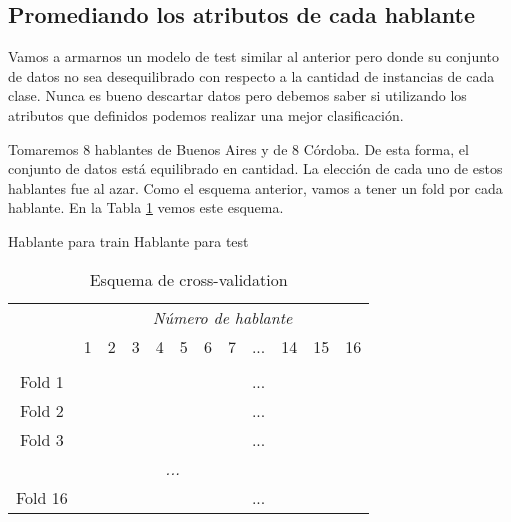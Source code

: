 \subsection{Promediando los atributos de cada hablante}

Vamos a armarnos un modelo de test similar al anterior pero donde su conjunto de datos no sea desequilibrado con respecto a la cantidad de instancias de cada clase. Nunca es bueno descartar datos pero debemos saber si utilizando los atributos que definidos podemos realizar una mejor clasificación.

Tomaremos 8 hablantes de Buenos Aires y de 8 Córdoba. De esta forma, el conjunto de datos está equilibrado en cantidad. La elección de cada uno de estos hablantes fue al azar. Como el esquema anterior, vamos a tener un fold por cada hablante. En la Tabla \ref{cv-porHabProm} vemos este esquema.

\begin{center}
	\mycirc[blue] Hablante para train \mycirc[red] Hablante para test
\end{center}

\begin{table}[H]
	\centering
	\begin{tabular}{cccccccccccc}
		& \multicolumn{11}{c}{\textit{Número de hablante}} \\
		& 1 & 2 & 3 & 4 & 5 & 6 & 7 & ... & 14 & 15 & 16 \\
		\hline \\
		Fold 1 &\mycirc[red] & \mycirc[blue] & \mycirc[blue]  & \mycirc[blue]  & \mycirc[blue]  & \mycirc[blue]  & \mycirc[blue] & ... & \mycirc[blue] & \mycirc[blue] & \mycirc[blue]  \\
		
		Fold 2 &\mycirc[blue] & \mycirc[red] & \mycirc[blue]  & \mycirc[blue]  & \mycirc[blue]  & \mycirc[blue]  & \mycirc[blue] & ... & \mycirc[blue] & \mycirc[blue] & \mycirc[blue]  \\
		
		Fold 3 &\mycirc[blue] & \mycirc[blue] & \mycirc[red]  & \mycirc[blue]  & \mycirc[blue]  & \mycirc[blue]  & \mycirc[blue] & ... & \mycirc[blue] & \mycirc[blue] & \mycirc[blue]  \\
		
		\multicolumn{11}{c}{\textit{...}}	\\
		
		Fold 16 &\mycirc[blue] & \mycirc[blue] & \mycirc[blue]  & \mycirc[blue]  & \mycirc[blue]  & \mycirc[blue]  & \mycirc[blue] & ... & \mycirc[blue] & \mycirc[blue] & \mycirc[red]   \\
		
	\end{tabular}
	\caption{Esquema de cross-validation}
	\label{cv-porHabProm}
\end{table}


